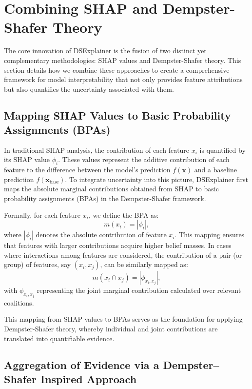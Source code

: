 \documentclass[acmlarge]{acmart}
\begin{document}
\section{Combining SHAP and Dempster-Shafer Theory}
\label{sec:combining}

The core innovation of DSExplainer is the fusion of two distinct yet complementary methodologies: SHAP values and Dempster-Shafer theory. This section details how we combine these approaches to create a comprehensive framework for model interpretability that not only provides feature attributions but also quantifies the uncertainty associated with them.

\subsection{Mapping SHAP Values to Basic Probability Assignments (BPAs)}

In traditional SHAP analysis, the contribution of each feature \( x_i \) is quantified by its SHAP value \( \phi_i \). These values represent the additive contribution of each feature to the difference between the model's prediction \( f(\mathbf{x}) \) and a baseline prediction \( f(\mathbf{x}_{\text{base}}) \). To integrate uncertainty into this picture, DSExplainer first maps the absolute marginal contributions obtained from SHAP to basic probability assignments (BPAs) in the Dempster-Shafer framework.

Formally, for each feature \( x_i \), we define the BPA as:
\[
m(x_i) = |\phi_i|,
\]
where \( |\phi_i| \) denotes the absolute contribution of feature \( x_i \). This mapping ensures that features with larger contributions acquire higher belief masses. In cases where interactions among features are considered, the contribution of a pair (or group) of features, say \( (x_i, x_j) \), can be similarly mapped as:
\[
m(x_i \cap x_j) = |\phi_{x_i, x_j}|,
\]
with \( \phi_{x_i, x_j} \) representing the joint marginal contribution calculated over relevant coalitions.

This mapping from SHAP values to BPAs serves as the foundation for applying Dempster-Shafer theory, whereby individual and joint contributions are translated into quantifiable evidence.

\subsection{Aggregation of Evidence via a Dempster--Shafer Inspired Approach}
\end{document}

